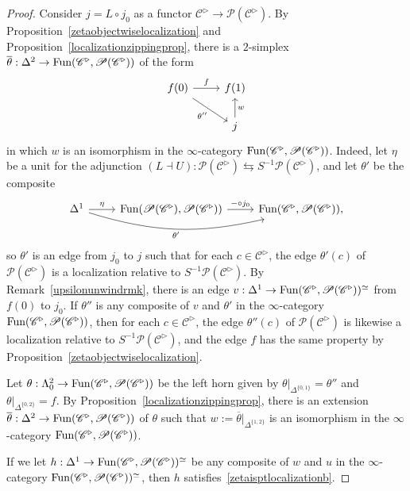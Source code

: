 \documentclass{tac}
\newcommand{\s}[1]{\mathscr{#1}}
\newcommand{\ol}[1]{\overline{#1}}
\newcommand{\tx}[1]{\textnormal{#1}}
\begin{document}
\begin{proof}
Consider $j=L\circ j_0$ as a functor $\s{C}^\triangleright \to \s{P}(\s{C}^\triangleright )$. By Proposition~\ref{zetaobjectwiselocalization} and Proposition~\ref{localizationzippingprop}, there is a $2$-simplex $\ol{\theta} : \Delta^2 \to \tx{Fun}(\s{C}^\triangleright , \s{P}(\s{C}^\triangleright ) )$ of the form
\[ \begin{tikzcd} f(0) \arrow[]{dr}[swap]{\theta''} \arrow[]{r}{f} & f(1) \\
 & j \arrow[]{u}[swap]{w} \end{tikzcd}\]
 in which $w$ is an isomorphism in the $\infty$-category $\tx{Fun}(\s{C}^\triangleright , \s{P}(\s{C}^\triangleright ) )$.  Indeed, let $\eta$ be a unit for the adjunction $(L \dashv U) : \s{P}(\s{C}^\triangleright ) \leftrightarrows S^{-1} \s{P}(\s{C}^\triangleright )$, and let $\theta'$ be the composite
 \[\begin{tikzcd} \Delta^1 \arrow[]{r}{\eta} \arrow[bend right=15]{rr}[swap]{\theta'} &  \tx{Fun}(\s{P}(\s{C}^\triangleright ),  \s{P}(\s{C}^\triangleright )) \arrow[]{r}{-\circ j_0} & \tx{Fun}( \s{C}^\triangleright ,  \s{P}(\s{C}^\triangleright )) ,
 \end{tikzcd}\] 
 so $\theta'$ is an edge from $j_0$ to $j$ such that for each $c\in \s{C}^\triangleright$, the edge $\theta' (c)$ of $\s{P}(\s{C}^\triangleright )$ is a localization relative to $S^{-1} \s{P}(\s{C}^\triangleright )$.  By Remark~\ref{upsilonunwindrmk}, there is an edge $v : \Delta^1 \to \tx{Fun}(\s{C}^\triangleright , \s{P}(\s{C}^\triangleright ) )^\simeq$ from $f(0)$ to $j_0$.  If $\theta''$ is any composite of $v$ and $\theta'$ in the $\infty$-category $ \tx{Fun}(\s{C}^\triangleright , \s{P}(\s{C}^\triangleright ) )$, then for each $c\in \s{C}^\triangleright$, the edge $\theta'' (c)$ of $\s{P}(\s{C}^\triangleright )$ is likewise a localization relative to $S^{-1} \s{P}(\s{C}^\triangleright )$, and the edge $f$ has the same property by Proposition~\ref{zetaobjectwiselocalization}.  
 
 Let $\theta : \Lambda^2_0 \to \tx{Fun}(\s{C}^\triangleright , \s{P}(\s{C}^\triangleright ) )$ be the left horn given by $\theta |_{\Delta^{\{0,1 \}}} = \theta''$ and $\theta |_{\Delta^{\{0,2 \}}} = f$.  By Proposition~\ref{localizationzippingprop}, there is an extension $\ol{\theta} : \Delta^2 \to \tx{Fun}(\s{C}^\triangleright , \s{P}(\s{C}^\triangleright ) )$ of $\theta$ such that $w:= \ol{\theta}|_{\Delta^{\{1,2\}}}$ is an isomorphism in the $\infty$-category $\tx{Fun}(\s{C}^\triangleright , \s{P}(\s{C}^\triangleright ) )$.

\hfill

If we let $h : \Delta^1 \to \tx{Fun}(\s{C}^\triangleright , \s{P}(\s{C}^\triangleright ) )^\simeq$ be any composite of $w$ and $u$ in the $\infty$-category $\tx{Fun}(\s{C}^\triangleright , \s{P}(\s{C}^\triangleright ) )^\simeq$, then $h$ satisfies~\ref{zetaisptlocalizationb}.
\end{proof}
\end{document}
